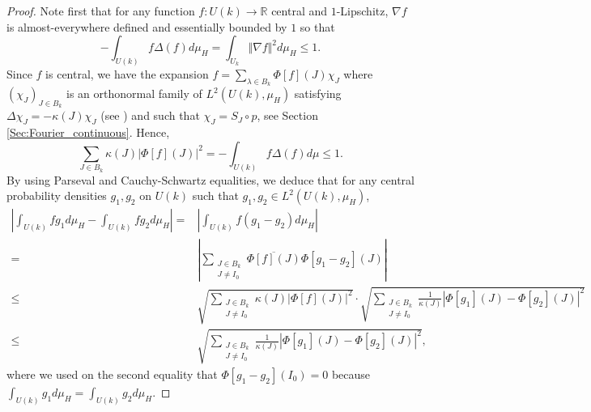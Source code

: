 \documentclass[10pt,11pt]{amsart}%
\begin{document}
\begin{proof}
Note first that for any function $f:U(k)\rightarrow \mathbb{R}$ central and $1$-Lipschitz, $\nabla f$ is almost-everywhere defined and essentially bounded by $1$ so that
$$-\int_{U(k)}f\Delta(f)d\mu_H=\int_{U_k} \Vert\nabla f\Vert^2d\mu_H\leq 1.$$
Since $f$ is central, we have the expansion $f=\sum_{\lambda\in  B_{k}}\Phi[f](J)\chi_J$ where $(\chi_J)_{J\in B_{k}}$ is an orthonormal family of $L^2(U(k),\mu_H)$ satisfying $\Delta \chi_{J}=-\kappa(J) \chi_J$ (see \cite[Prop. 12.1.2]{Far}) and such that $\chi_{J}=S_J\circ p$, see Section \ref{Sec:Fourier_continuous}. Hence,
$$\sum_{J\in B_{k}}\kappa(J)\vert\Phi[f](J)\vert^2=-\int_{U(k)}f\Delta(f)d\mu\leq 1.$$
By using Parseval and Cauchy-Schwartz equalities, we deduce that for any central probability densities $g_1,g_2$ on $U(k)$ such that $g_1,g_2\in L^2(U(k),\mu_H)$, 
\begin{align}
\left\vert \int_{U(k)}fg_1d\mu_H-\int_{U(k)}fg_2d\mu_H\right\vert=&\left\vert \int_{U(k)}f(g_1-g_2)d\mu_H\right\vert\nonumber\\
=&\left\vert \sum_{\substack{J\in B_{k}\\J\not=I_0}}\overline{\Phi[f](J)}\Phi[g_1-g_2](J)\right\vert\nonumber\\
\leq&\sqrt{\sum_{\substack{J\in B_{k}\\J\not=I_0}}\kappa(J)\left\vert \Phi[f](J)\right\vert^2}\cdot\sqrt{\sum_{\substack{J\in B_{k}\\J\not=I_0}}\frac{1}{\kappa(J)}\left\vert \Phi[g_1](J)-\Phi[g_2](J)\right\vert^2}\nonumber\\
\leq&\sqrt{\sum_{\substack{J\in B_{k}\\J\not=I_0}}\frac{1}{\kappa(J)}\left\vert \Phi[g_1](J)-\Phi[g_2](J)\right\vert^2},\label{eq:Berry-Essen_bound_first_inequality}
\end{align}
where we used on the second equality that $\Phi[g_1-g_2](I_0)=0$ because $\int_{U(k)}g_1d\mu_H=\int_{U(k)}g_2d\mu_H$.


\end{proof}
\end{document}
